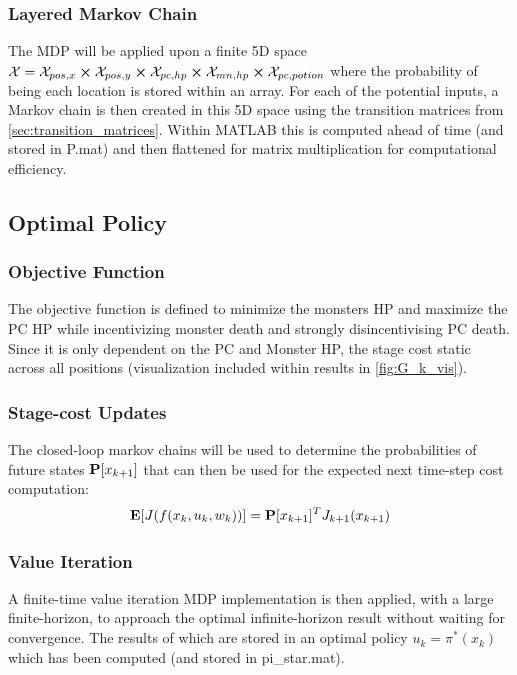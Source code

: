 \documentclass[letterpaper, 10 pt, conference]{ieeeconf}
\begin{document}
\subsubsection{Layered Markov Chain}
The MDP will be applied upon a finite 5D space $\mathcal{X} = \mathcal{X}_{pos,x} \cross \mathcal{X}_{pos,y} \cross \mathcal{X}_{pc,hp} \cross \mathcal{X}_{mn,hp} \cross \mathcal{X}_{pc,potion}$ where the probability of being each location is stored within an array.
For each of the potential inputs, a Markov chain is then created in this 5D space using the transition matrices from \autoref{sec:transition_matrices}.
Within MATLAB this is computed ahead of time (and stored in P.mat) and then flattened for matrix multiplication for computational efficiency.

\subsection{Optimal Policy}
\subsubsection{Objective Function}
The objective function is defined to minimize the monsters HP and maximize the PC HP while incentivizing monster death and strongly disincentivising PC death.
Since it is only dependent on the PC and Monster HP, the stage cost static across all positions (visualization included within results in \cref{fig:G_k_vis}).

\subsubsection{Stage-cost Updates}
The closed-loop markov chains will be used to determine the probabilities of future states $\vb{P}[x_{k+1}]$ that can then be used for the expected next time-step cost computation: \[
    \vb{E}[J(f(x_k,u_k,w_k))] = \vb{P}[x_{k+1}]^T J_{k+1}(x_{k+1})
\]
\subsubsection{Value Iteration}
A finite-time value iteration MDP implementation is then applied, with a large finite-horizon, to approach the optimal infinite-horizon result without waiting for convergence.
The results of which are stored in an optimal policy $u_k = \pi^{*}(x_k)$ which has been computed (and stored in pi\_star.mat).

\end{document}
